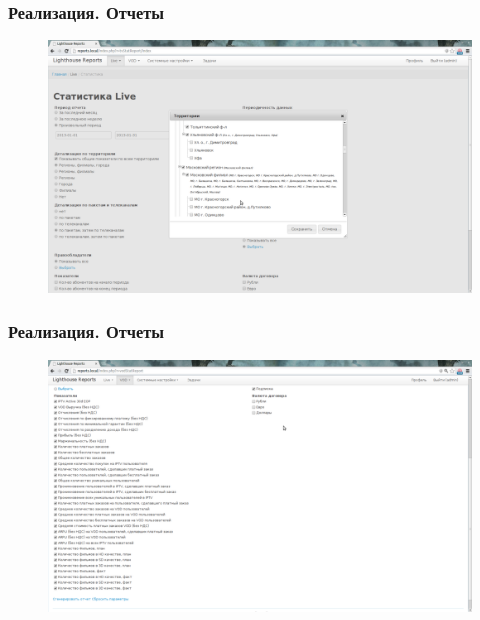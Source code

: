 \documentclass{beamer}
\begin{document}
\begin{frame}
\frametitle{Реализация. Отчеты}
\begin{figure}
\vspace{-0.5cm}
\hspace*{-1cm} \includegraphics[scale=0.26]{../resources/reports-region.pdf}
\end{figure}
\end{frame}

\begin{frame}
\frametitle{Реализация. Отчеты}
\begin{figure}
\vspace{-0.5cm}
\hspace*{-1cm} \includegraphics[scale=0.26]{../resources/report-indicator.pdf}
\end{figure}
\end{frame}
\end{document}
